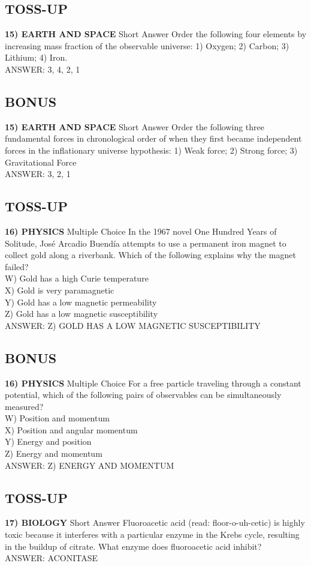 \documentclass{article}
\begin{document}
\subsection*{TOSS-UP}
\textbf{15) EARTH AND SPACE} Short Answer Order the following four elements by increasing mass fraction of the observable universe: 1) Oxygen; 2) Carbon; 3) Lithium; 4) Iron.
\\ANSWER: 3, 4, 2, 1

\subsection*{BONUS}
\textbf{15) EARTH AND SPACE} Short Answer Order the following three fundamental forces in chronological order of when they first became independent forces in the inflationary universe hypothesis: 1) Weak force; 2) Strong force; 3) Gravitational Force
\\ANSWER: 3, 2, 1

\subsection*{TOSS-UP}
\textbf{16) PHYSICS} Multiple Choice In the 1967 novel One Hundred Years of Solitude, José Arcadio Buendía attempts to use a permanent iron magnet to collect gold along a riverbank. Which of the following explains why the magnet failed?
\\W) Gold has a high Curie temperature
\\X) Gold is very paramagnetic
\\Y) Gold has a low magnetic permeability
\\Z) Gold has a low magnetic susceptibility
\\ANSWER: Z) GOLD HAS A LOW MAGNETIC SUSCEPTIBILITY

\subsection*{BONUS}
\textbf{16) PHYSICS} Multiple Choice For a free particle traveling through a constant potential, which of the following pairs of observables can be simultaneously measured?
\\W) Position and momentum
\\X) Position and angular momentum
\\Y) Energy and position
\\Z) Energy and momentum
\\ANSWER: Z) ENERGY AND MOMENTUM

\subsection*{TOSS-UP}
\textbf{17) BIOLOGY} Short Answer Fluoroacetic acid (read: floor-o-uh-cetic) is highly toxic because it interferes with a particular enzyme in the Krebs cycle, resulting in the buildup of citrate. What enzyme does fluoroacetic acid inhibit?
\\ANSWER: ACONITASE
\end{document}
